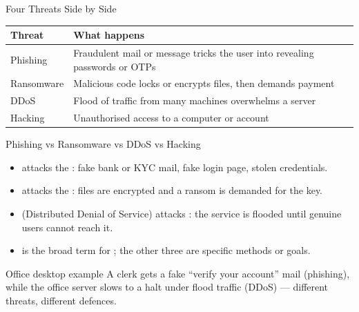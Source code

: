 \documentclass[aspectratio=169]{beamer}
\begin{document}
\begin{frame}{Four Threats Side by Side}
  \begin{center}
    \begin{tabular}{p{}p{}}
      \toprule
      \textbf{Threat} & \textbf{What happens} \\
      \midrule
      Phishing & Fraudulent mail or message tricks the user into revealing passwords or OTPs \\
      Ransomware & Malicious code locks or encrypts files, then demands payment \\
      DDoS & Flood of traffic from many machines overwhelms a server \\
      Hacking & Unauthorised access to a computer or account \\
      \bottomrule
    \end{tabular}
  \end{center}
  \vspace{0.25cm}
\end{frame}

\begin{frame}{Phishing vs Ransomware vs DDoS vs Hacking}
  \begin{itemize}
    \item {} attacks the : fake bank or KYC mail, fake
      login page, stolen credentials.
    \item {} attacks the : files are encrypted and a
      ransom is demanded for the key.
    \item {} (Distributed Denial of Service) attacks
      : the service is flooded until genuine users cannot
      reach it.
    \item {} is the broad term for ; the
      other three are specific methods or goals.
  \end{itemize}
  \begin{exampleblock}{Office desktop example}
    A clerk gets a fake ``verify your account'' mail (phishing), while the
    office server slows to a halt under flood traffic (DDoS) --- different
    threats, different defences.
  \end{exampleblock}
\end{frame}
\end{document}
